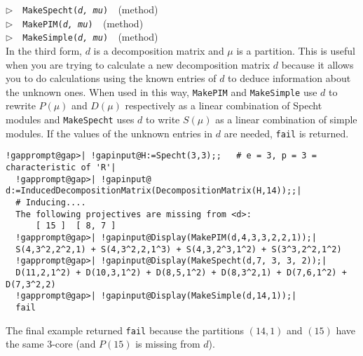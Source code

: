\documentclass[a4paper,11pt]{report}
\begin{document}
{{{ \noindent\textcolor{FuncColor}{$\triangleright$\ \ \texttt{MakeSpecht({\mdseries\slshape d, mu})
\label{MakeSpecht:for a decomposition matrix}
}\hfill{\scriptsize (method)}}\\
\noindent\textcolor{FuncColor}{$\triangleright$\ \ \texttt{MakePIM({\mdseries\slshape d, mu})
\label{MakePIM:for a decomposition matrix}
}\hfill{\scriptsize (method)}}\\
\noindent\textcolor{FuncColor}{$\triangleright$\ \ \texttt{MakeSimple({\mdseries\slshape d, mu})
\label{MakeSimple:for a decomposition matrix}
}\hfill{\scriptsize (method)}}\\


 In the third form, $d$ is a decomposition matrix and $\mu$ is a partition. This is useful when you are trying to calculate a new
decomposition matrix $d$ because it allows you to do calculations using the known entries of $d$ to deduce information about the unknown ones. When used in this way, \texttt{MakePIM} and \texttt{MakeSimple} use $d$ to rewrite $P(\mu)$ and $D(\mu)$ respectively as a linear combination of Specht modules and \texttt{MakeSpecht} uses $d$ to write $S(\mu)$ as a linear combination of simple modules. If the values of the unknown
entries in $d$ are needed, \texttt{fail} is returned. 
\begin{Verbatim}[commandchars=!@|,fontsize=\small,frame=single,label=Example]
  !gapprompt@gap>| !gapinput@H:=Specht(3,3);;   # e = 3, p = 3 = characteristic of 'R'|
  !gapprompt@gap>| !gapinput@ d:=InducedDecompositionMatrix(DecompositionMatrix(H,14));;|
  # Inducing....
  The following projectives are missing from <d>:
      [ 15 ]  [ 8, 7 ]
  !gapprompt@gap>| !gapinput@Display(MakePIM(d,4,3,3,2,2,1));|
  S(4,3^2,2^2,1) + S(4,3^2,2,1^3) + S(4,3,2^3,1^2) + S(3^3,2^2,1^2)
  !gapprompt@gap>| !gapinput@Display(MakeSpecht(d,7, 3, 3, 2));|
  D(11,2,1^2) + D(10,3,1^2) + D(8,5,1^2) + D(8,3^2,1) + D(7,6,1^2) + D(7,3^2,2)
  !gapprompt@gap>| !gapinput@Display(MakeSimple(d,14,1));|
  fail
\end{Verbatim}
 The final example returned \texttt{fail} because the partitions $(14,1)$ and $(15)$ have the same $3$-core (and $P(15)$ is missing from $d$).

}}}
\end{document}
